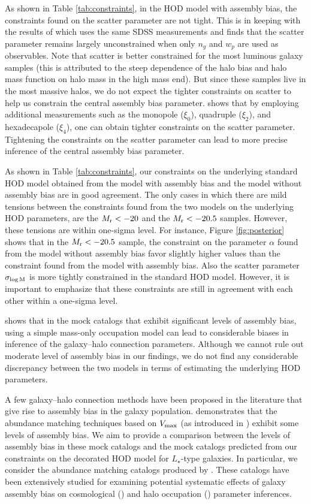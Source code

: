 \documentclass[12pt, preprint]{aastex}
\newcommand{\sigmam}{\sigma_{\log \rm M}}
\begin{document}
As shown in Table \ref{tab:constraints}, in the HOD model with assembly bias, the constraints found on the scatter parameter are not tight. This is in keeping with the results of \citet{guo2015} which uses the same SDSS measurements and finds that the scatter parameter remains largely unconstrained when only $n_{g}$ and $w_{p}$ are used as observables. Note that scatter is better constrained for the most luminous galaxy samples (this is attributed to the steep dependence of the halo bias and halo mass function on halo mass in the high mass end). But since these samples live in the most massive halos, we do not expect the tighter constraints on scatter to help us constrain the central assembly bias parameter. \citet{guo2015} shows that by employing additional measurements such as the monopole ($\xi_{0}$), quadruple ($\xi_{2}$), and hexadecapole ($\xi_{4}$), one can obtain tighter constraints on the scatter parameter. Tightening the constraints on the scatter parameter can lead to more precise inference of the central assembly bias parameter.    

As shown in Table \ref{tab:constraints}, our constraints on the underlying standard HOD model obtained from the model with assembly bias and the model without assembly bias are in good agreement. The only cases in which there are mild tensions between the constraints found from the two models on the underlying HOD parameters, are the $M_{\rm r}<-20$ and the $M_{\rm r}<-20.5$ samples. However, these tensions are within one-sigma level. For instance, Figure \ref{fig:posterior} shows that in the $M_{\rm r}<-20.5$ sample, the constraint on the parameter $\alpha$ found from the model without assembly bias favor slightly higher values than the constraint found from the model with assembly bias. Also the scatter parameter $\sigmam$ is more tightly constrained in the standard HOD model. However, it is important to emphasize that these constraints are still in agreement with each other within a one-sigma level. 

\citet{arz2014} shows that in the mock catalogs that exhibit significant levels of assembly bias, using a simple mass-only occupation model can lead to considerable biases in inference of the galaxy--halo connection parameters. Although we cannot rule out moderate level of assembly bias in our findings, we do not find any considerable discrepancy between the two models in terms of estimating the underlying HOD parameters. 
 
A few galaxy--halo connection methods have been proposed in the literature that give rise to assembly bias in the galaxy population. \citet{arz2014} demonstrates that the abundance matching techniques based on $V_{\rm max }$ (as introduced in \citealt{hw2013,reddick2013}) exhibit some levels of assembly bias. 
We aim to provide a comparison between the levels of assembly bias in these mock catalogs and the mock catalogs predicted from our constraints on the decorated HOD model for $L_{\star}$-type galaxies. In particular, we consider the abundance matching catalogs produced by \citet{hw2013}. These catalogs have been extensively studied for examining potential systematic effects of galaxy assembly bias on cosmological (\citealt{edHOD-weinberg}) and halo occupation (\citealt{arz2014}) parameter inferences. 
\end{document}
